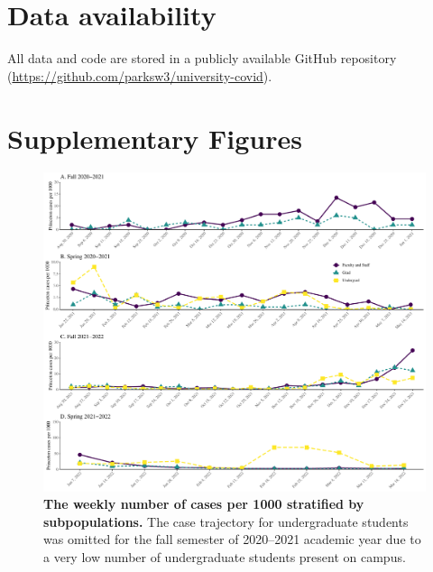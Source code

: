 \documentclass[12pt]{article}
\begin{document}
\section*{Data availability}

All data and code are stored in a publicly available GitHub repository (\url{https://github.com/parksw3/university-covid}).



\pagebreak

\section*{Supplementary Figures}

\renewcommand{\thefigure}{S\arabic{figure}}
\setcounter{figure}{0}

\begin{figure}[!htp]
\includegraphics[width=\textwidth]{../figure_princeton_new/figure_princeton_new_per_1000_bypop.pdf}
\caption{
\textbf{The weekly number of cases per 1000 stratified by subpopulations.}
The case trajectory for undergraduate students was omitted for the fall semester of 2020--2021 academic year due to a very low number of undergraduate students present on campus.
}
\end{figure}

\pagebreak
\end{document}
